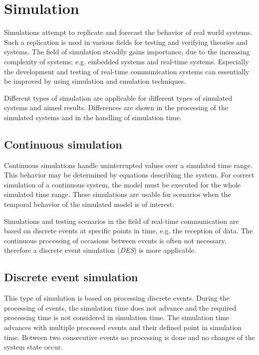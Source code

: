 \chapter{Simulation}
\label{cha:simulation}

Simulations attempt to replicate and forecast the behavior of real world systems.
Such a replication is used in various fields for testing and verifying theories and systems.
The field of simulation steadily gains importance, due to the increasing complexity of systems; e.g. embedded systems and real-time systems.
Especially the development and testing of real-time communication systems can essentially be improved by using simulation and emulation techniques.

Different types of simulation are applicable for different types of simulated systems and aimed results.
Differences are shown in the processing of the simulated systems and in the handling of simulation time.
\cite[section 1.2]{mchaney2009understanding}

\section{Continuous simulation}
\label{sec:simulation_cont}
Continuous simulations handle uninterrupted values over a simulated time range.
This behavior may be determined by equations describing the system.
For correct simulation of a continuous system, the model must be executed for the whole simulated time range.
These simulations are usable for scenarios when the temporal behavior of the simulated model is of interest. \cite[section 1.2.1]{mchaney2009understanding}

Simulations and testing scenarios in the field of real-time communication are based on discrete events at specific points in time, e.g. the reception of data.
The continuous processing of occasions between events is often not necessary, therefore a discrete event simulation (\emph{DES}) is more applicable.

\section{Discrete event simulation}
\label{sec:simulation_event}
This type of simulation is based on processing discrete events.
During the processing of events, the simulation time does not advance and the required processing time is not considered in simulation time.
The simulation time advances with multiple processed events and their defined point in simulation time.
Between two consecutive events no processing is done and no changes of the system state occur. \cite[chapter 1]{matloff_introduction_2008}

